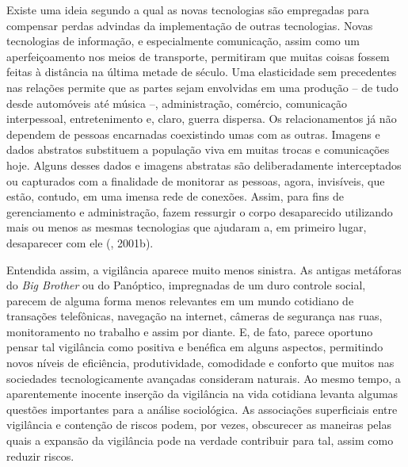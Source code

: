 Existe uma ideia segundo a qual as novas tecnologias são empregadas para
compensar perdas advindas da implementação de outras tecnologias. Novas
tecnologias de informação, e especialmente comunicação, assim como um
aperfeiçoamento nos meios de transporte, permitiram que muitas coisas
fossem feitas à distância na última metade de século. Uma elasticidade
sem precedentes nas relações permite que as partes sejam envolvidas em
uma produção -- de tudo desde automóveis até música --, administração,
comércio, comunicação interpessoal, entretenimento e, claro, guerra
dispersa. Os relacionamentos já não dependem de pessoas encarnadas
coexistindo umas com as outras. Imagens e dados abstratos substituem a
população viva em muitas trocas e comunicações hoje. Alguns desses dados
e imagens abstratas são deliberadamente interceptados ou capturados com
a finalidade de monitorar as pessoas, agora, invisíveis, que estão,
contudo, em uma imensa rede de conexões. Assim, para fins de
gerenciamento e administração, fazem ressurgir o corpo desaparecido
utilizando mais ou menos as mesmas tecnologias que ajudaram a, em
primeiro lugar, desaparecer com ele (, 2001b).

Entendida assim, a vigilância aparece muito menos sinistra. As antigas
metáforas do \emph{Big Brother} ou do Panóptico, impregnadas de um duro
controle social, parecem de alguma forma menos relevantes em um mundo
cotidiano de transações telefônicas, navegação na internet, câmeras de
segurança nas ruas, monitoramento no trabalho e assim por diante. E, de
fato, parece oportuno pensar tal vigilância como positiva e benéfica em
alguns aspectos, permitindo novos níveis de eficiência, produtividade,
comodidade e conforto que muitos nas sociedades tecnologicamente
avançadas consideram naturais. Ao mesmo tempo, a aparentemente inocente
inserção da vigilância na vida cotidiana levanta algumas questões
importantes para a análise sociológica. As associações superficiais
entre vigilância e contenção de riscos podem, por vezes, obscurecer as
maneiras pelas quais a expansão da vigilância pode na verdade contribuir
para tal, assim como reduzir riscos.

